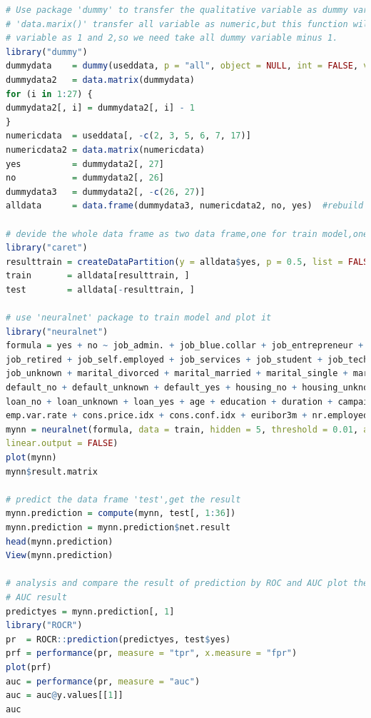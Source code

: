 \documentclass[12pt, a4paper, bibliography=totoc, english]{scrartcl}
\begin{document}
\begin{lstlisting}[language = R]
# Use package 'dummy' to transfer the qualitative variable as dummy variable, and use
# 'data.marix()' transfer all variable as numeric,but this function will change all dummy
# variable as 1 and 2,so we need take all dummy variable minus 1.
library("dummy")
dummydata    = dummy(useddata, p = "all", object = NULL, int = FALSE, verbose = FALSE)
dummydata2   = data.matrix(dummydata)
for (i in 1:27) {
dummydata2[, i] = dummydata2[, i] - 1
}
numericdata  = useddata[, -c(2, 3, 5, 6, 7, 17)]
numericdata2 = data.matrix(numericdata)
yes          = dummydata2[, 27]
no           = dummydata2[, 26]
dummydata3   = dummydata2[, -c(26, 27)]
alldata      = data.frame(dummydata3, numericdata2, no, yes)  #rebuild the data frame as numerical data frame.

# devide the whole data frame as two data frame,one for train model,one for test model.
library("caret")
resulttrain = createDataPartition(y = alldata$yes, p = 0.5, list = FALSE)
train       = alldata[resulttrain, ]
test        = alldata[-resulttrain, ]

# use 'neuralnet' package to train model and plot it
library("neuralnet")
formula = yes + no ~ job_admin. + job_blue.collar + job_entrepreneur + job_housemaid + job_management + 
job_retired + job_self.employed + job_services + job_student + job_technician + job_unemployed + 
job_unknown + marital_divorced + marital_married + marital_single + marital_unknown + 
default_no + default_unknown + default_yes + housing_no + housing_unknown + housing_yes + 
loan_no + loan_unknown + loan_yes + age + education + duration + campaign + pdays + previous + 
emp.var.rate + cons.price.idx + cons.conf.idx + euribor3m + nr.employed
mynn = neuralnet(formula, data = train, hidden = 5, threshold = 0.01, act.fct = "logistic", 
linear.output = FALSE)
plot(mynn)
mynn$result.matrix

# predict the data frame 'test',get the result
mynn.prediction = compute(mynn, test[, 1:36])
mynn.prediction = mynn.prediction$net.result
head(mynn.prediction)
View(mynn.prediction)

# analysis and compare the result of prediction by ROC and AUC plot the ROC picture and
# AUC result
predictyes = mynn.prediction[, 1]
library("ROCR")
pr  = ROCR::prediction(predictyes, test$yes)
prf = performance(pr, measure = "tpr", x.measure = "fpr")
plot(prf)
auc = performance(pr, measure = "auc")
auc = auc@y.values[[1]]
auc
\end{lstlisting}
\end{document}
